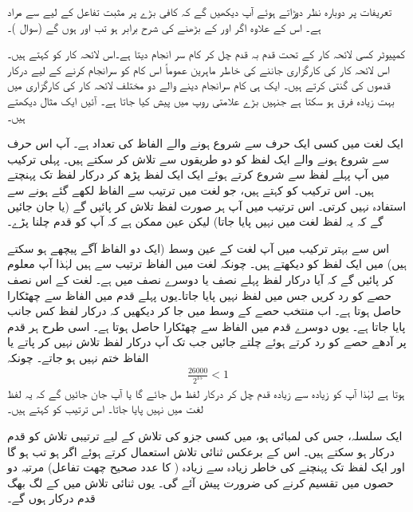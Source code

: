 تعریفات  پر دوبارہ نظر دوڑاتے ہوئے  آپ دیکھیں گے کہ کافی بڑے  پر مثبت تفاعل کے لیے  سے مراد  ہے۔ اس کے علاوہ اگر  اور   کے بڑھنے کی شرح  برابر  ہو تب  اور  ہوں گے (سوال )۔ 

کمپیوٹر کسی لائحہ کار کے تحت قدم بہ قدم چل کر  کام سر انجام دیتا ہے۔اس لائحہ کار کو  کہتے ہیں۔اس لائحہ کار کی کارگزاری جاننے کی خاطر ماہرین عموماً اس کام کو سرانجام کرنے کے لیے درکار قدموں کی گنتی کرتے ہیں۔ ایک ہی کام سرانجام دینے والے  دو مختلف لائحہ کار کی کارگزاری میں بہت زیادہ فرق ہو سکتا ہے جنہیں بڑے  علامتی روپ میں پیش کیا جاتا ہے۔ آئیں ایک مثال دیکھتے ہیں۔

ایک لغت میں کسی ایک حرف سے شروع ہونے والے الفاظ کی تعداد   ہے۔ آپ اس حرف سے شروع ہونے والے ایک لفظ کو دو طریقوں سے تلاش کر سکتے ہیں۔ پہلی ترکیب میں آپ پہلے لفظ سے شروع کرتے ہوئے  ایک ایک لفظ پڑھ کر درکار لفظ تک پہنچتے ہیں۔ اس ترکیب کو  کہتے ہیں،  جو لغت میں ترتیب سے الفاظ لکھے گئے ہونے سے استفادہ نہیں کرتی۔ اس ترتیب میں آپ ہر صورت لفظ تلاش کر پائیں گے (یا جان جائیں گے کہ یہ لفظ لغت میں  نہیں پایا جاتا) لیکن عین ممکن ہے کہ آپ کو  قدم چلنا پڑے۔

اس سے بہتر ترکیب میں آپ لغت کے عین وسط (ایک دو الفاظ آگے پیچھے ہو سکتے ہیں) میں ایک لفظ کو دیکھتے ہیں۔ چونکہ لغت میں الفاظ ترتیب سے ہیں لہٰذا آپ معلوم کر پائیں گے کہ آیا درکار لفظ پہلے  نصف یا دوسرے  نصف  میں ہے۔ لغت کے اس نصف حصے کو رد کریں جس میں لفظ  نہیں پایا جاتا۔یوں پہلے قدم میں  الفاظ سے چھٹکارا حاصل ہوتا ہے۔  اب منتخب حصے  کے وسط  میں جا کر دیکھیں کہ درکار لفظ کس جانب پایا جاتا ہے۔ یوں دوسرے قدم میں  الفاظ سے چھٹکارا حاصل ہوتا ہے۔ اسی طرح ہر قدم پر آدھے حصے کو رد کرتے ہوئے چلتے جائیں جب تک آپ درکار لفظ تلاش نہیں کر پاتے یا الفاظ ختم نہیں ہو جاتے۔ چونکہ
\begin{align*}
\frac{26000}{2^{15}}<1
\end{align*}
ہوتا ہے لہٰذا  آپ کو زیادہ سے زیادہ  قدم چل کر درکار لفظ مل جائے گا یا آپ جان جائیں گے کہ یہ لفظ لغت میں نہیں پایا جاتا۔ اس ترتیب کو  کہتے ہیں۔

ایک سلسلہ، جس کی لمبائی  ہو،  میں کسی جزو کی تلاش کے لیے ترتیبی تلاش کو  قدم درکار ہو سکتے ہیں۔ اس کے برعکس ثنائی تلاش استعمال کرتے ہوئے  اگر    ہو تب  ہو گا اور ایک لفظ تک پہنچنے کی خاطر زیادہ سے زیادہ  ( کا عدد صحیح چھت تفاعل)   مرتبہ  دو حصوں میں تقسیم  کرنے کی ضرورت پیش آئے گی۔ یوں ثنائی تلاش میں   کے لگ بھگ  قدم درکار ہوں گے۔ 


